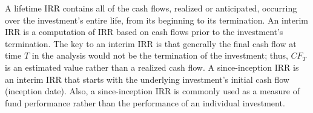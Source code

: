 \documentclass[11pt]{article}
\begin{document}
A lifetime IRR contains all of the cash flows, realized or anticipated, occurring over the investment's entire life, from its beginning to its termination. An interim IRR is a computation of IRR based on cash flows prior to the investment's termination. The key to an interim IRR is that generally the final cash flow at time $T$ in the analysis would not be the termination of the investment; thus, $C F_{T}$ is an estimated value rather than a realized cash flow. A since-inception IRR is an interim IRR that starts with the underlying investment's initial cash flow (inception date). Also, a since-inception IRR is commonly used as a measure of fund performance rather than the performance of an individual investment.
\end{document}
